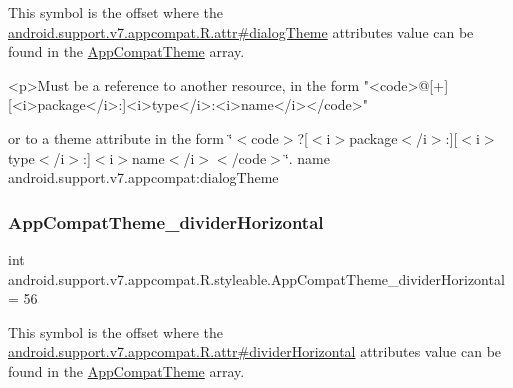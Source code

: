 This symbol is the offset where the \hyperlink{classandroid_1_1support_1_1v7_1_1appcompat_1_1R_1_1attr_a28476f24cdf79d9dc7f352e4daf95ecf}{android.\+support.\+v7.\+appcompat.\+R.\+attr\#dialog\+Theme} attribute\textquotesingle{}s value can be found in the \hyperlink{classandroid_1_1support_1_1v7_1_1appcompat_1_1R_1_1styleable_a5c42f89e8a410c323be34208d75c430b}{App\+Compat\+Theme} array.

\begin{DoxyVerb}      <p>Must be a reference to another resource, in the form "<code>@[+][<i>package</i>:]<i>type</i>:<i>name</i></code>"
\end{DoxyVerb}
 or to a theme attribute in the form \char`\"{}$<$code$>$?\mbox{[}$<$i$>$package$<$/i$>$\+:\mbox{]}\mbox{[}$<$i$>$type$<$/i$>$\+:\mbox{]}$<$i$>$name$<$/i$>$$<$/code$>$\char`\"{}.  name android.\+support.\+v7.\+appcompat\+:dialog\+Theme \mbox{\label{classandroid_1_1support_1_1v7_1_1appcompat_1_1R_1_1styleable_a9f9eeb41cd04fde184cb1d33ff02ac4c}} 
\subsubsection{\texorpdfstring{App\+Compat\+Theme\+\_\+divider\+Horizontal}{AppCompatTheme\_dividerHorizontal}}
{\footnotesize\ttfamily int android.\+support.\+v7.\+appcompat.\+R.\+styleable.\+App\+Compat\+Theme\+\_\+divider\+Horizontal = 56\hspace{0.3cm}{\ttfamily [static]}}

This symbol is the offset where the \hyperlink{classandroid_1_1support_1_1v7_1_1appcompat_1_1R_1_1attr_a447c1b9600c69124b589aa4532867757}{android.\+support.\+v7.\+appcompat.\+R.\+attr\#divider\+Horizontal} attribute\textquotesingle{}s value can be found in the \hyperlink{classandroid_1_1support_1_1v7_1_1appcompat_1_1R_1_1styleable_a5c42f89e8a410c323be34208d75c430b}{App\+Compat\+Theme} array.

